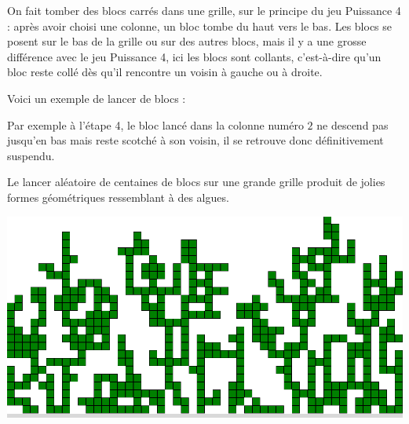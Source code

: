 \documentclass[11pt,class=report,crop=false]{standalone}
\begin{document}
\begin{cours}
On fait tomber des blocs carrés dans une grille, sur le principe du jeu \og{}Puissance 4\fg{} : après avoir choisi une colonne, un bloc tombe du haut vers le bas. Les blocs se posent sur le bas de la grille ou sur des autres blocs, mais il y a une grosse différence avec le jeu \og{}Puissance 4\fg{}, ici les blocs sont \og{}collants\fg{}, c'est-à-dire qu'un bloc reste collé dès qu'il rencontre un voisin à gauche ou à droite.


Voici un exemple de lancer de blocs :

Par exemple à l'étape 4, le bloc lancé dans la colonne numéro $2$ ne descend pas jusqu'en bas mais reste \og{}scotché\fg{} à son voisin, il se retrouve donc définitivement suspendu.

Le lancer aléatoire de centaines de blocs sur une grande grille produit de jolies formes géométriques ressemblant à des algues.

\begin{center}
\includegraphics[scale=0.3]{ecran-alea-bloc0}
\end{center}

\end{cours}



\end{document}
